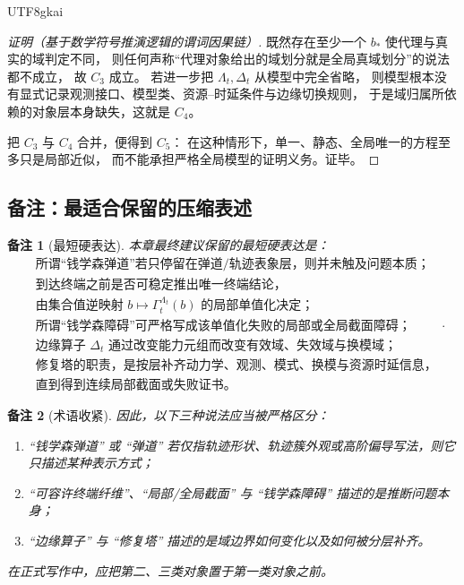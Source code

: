 \documentclass[12pt]{article}
\newtheorem{remark}{备注}[section]
\begin{document}
\begin{CJK*}{UTF8}{gkai}
\begin{proof}[证明（基于数学符号推演逻辑的谓词因果链）]
既然存在至少一个 $b_\ast$ 使代理与真实的域判定不同，
则任何声称“代理对象给出的域划分就是全局真域划分”的说法都不成立，
故 \(C_3\) 成立。
若进一步把 $\Lambda_t,\Delta_t$ 从模型中完全省略，
则模型根本没有显式记录观测接口、模型类、资源--时延条件与边缘切换规则，
于是域归属所依赖的对象层本身缺失，这就是 \(C_4\)。

把 \(C_3\) 与 \(C_4\) 合并，便得到 \(C_5\)：
在这种情形下，单一、静态、全局唯一的方程至多只是局部近似，
而不能承担严格全局模型的证明义务。证毕。
\end{proof}

\subsection{备注：最适合保留的压缩表述}
\label{subsec:tex1-ch1-remarks}

\begin{remark}[最短硬表达]
本章最终建议保留的最短硬表达是：
\[
  \boxed{
    \begin{aligned}
      &\text{所谓“钱学森弹道”若只停留在弹道/轨迹表象层，则并未触及问题本质；}\\
      &\text{到达终端之前是否可稳定推出唯一终端结论，}\\
      &\text{由集合值逆映射 }b\mapsto \Gamma_t^{\Lambda_t}(b)\text{ 的局部单值化决定；}\\
      &\text{所谓“钱学森障碍”可严格写成该单值化失败的局部或全局截面障碍；}\\
      &\text{边缘算子 }\Delta_t\text{ 通过改变能力元组而改变有效域、失效域与换模域；}\\
      &\text{修复塔的职责，是按层补齐动力学、观测、模式、换模与资源时延信息，}\\
      &\text{直到得到连续局部截面或失败证书。}
    \end{aligned}
  }.
\]
\end{remark}

\begin{remark}[术语收紧]
因此，以下三种说法应当被严格区分：
\begin{enumerate}
  \item ``钱学森弹道'' 或 ``弹道'' 若仅指轨迹形状、轨迹簇外观或高阶偏导写法，则它只描述某种表示方式；
  \item ``可容许终端纤维''、``局部/全局截面'' 与 ``钱学森障碍'' 描述的是推断问题本身；
  \item ``边缘算子'' 与 ``修复塔'' 描述的是域边界如何变化以及如何被分层补齐。
\end{enumerate}
在正式写作中，应把第二、三类对象置于第一类对象之前。
\end{remark}


\end{CJK*}
\end{document}
